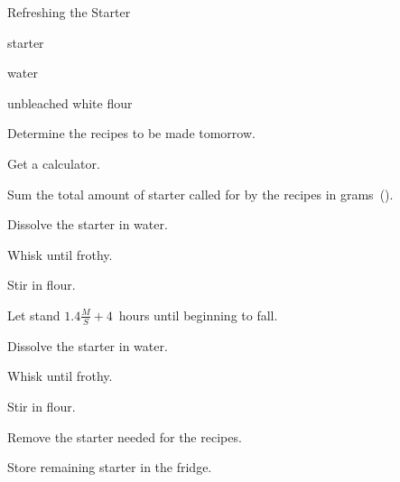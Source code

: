 \begin{recipe}{Refreshing the Starter}{}{}

\begin{ingredients}
\item {} starter
\item water
\item unbleached white flour
\end{ingredients}

\begin{directions}
\item Determine the recipes to be made tomorrow.
\item Get a calculator.
\item Sum the total amount of starter called for by the recipes in grams~().
\item Dissolve the starter in  water.
\item Whisk until frothy.
\item Stir in  flour.
\item Let stand $1.4\frac{M}{S} + 4$~hours until beginning to fall.
\item Dissolve the starter in  water.
\item Whisk until frothy. 
\item Stir in  flour.
\item Remove the starter needed for the recipes.
\item Store remaining starter in the fridge.
\end{directions}

\end{recipe}
